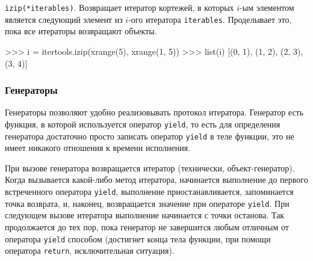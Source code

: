 \lstinline{izip(*iterables)}. Возвращает итератор кортежей, в которых $i$-ым элементом является следующий элемент из $i$-ого итератора \lstinline{iterables}. Проделывает это, пока все итераторы возвращают объекты.
\begin{pylst}{}{}
>>> i = itertools.izip(xrange(5), xrange(1, 5))
>>> list(i)
[(0, 1), (1, 2), (2, 3), (3, 4)]
\end{pylst}

\subsubsection{Генераторы}
Генераторы позволяют удобно реализовывать протокол итератора. Генератор есть функция, в которой используется оператор \lstinline{yield}, то есть для определения генератора достаточно просто записать оператор \lstinline{yield} в теле функции, это не имеет никакого отношения к времени исполнения.

При вызове генератора возвращается итератор (технически, объект-генератор). Когда вызывается какой-либо метод итератора, начинается выполнение до первого встреченного оператора \lstinline{yield}, выполнение приостанавливается, запоминается точка возврата, и, наконец, возвращается значение при операторе \lstinline{yield}. При следующем вызове итератора выполнение начинается с точки останова. Так продолжается до тех пор, пока генератор не завершится любым отличным от оператора \lstinline{yield} способом (достигнет конца тела функции, при помощи оператора \lstinline{return}, исключительная ситуация).

